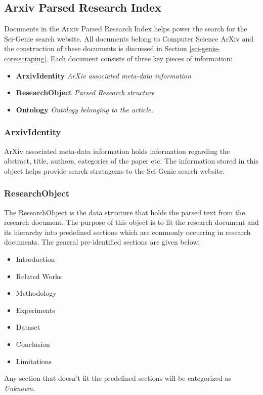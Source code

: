 \subsection{Arxiv Parsed Research Index}

Documents in the Arxiv Parsed Research Index helps power the search for the Sci-Genie search website. All documents belong to Computer Science ArXiv and 
the construction of these documents is discussed in Section \ref{sci-genie-core:scraping}. Each document consists of three 
key pieces of information:
\begin{itemize}
    \item \textbf{ArxivIdentity} \textit{ArXiv associated meta-data information}
    \item \textbf{ResearchObject} \textit{Parsed Research structure}
    \item \textbf{Ontology} \textit{Ontology belonging to the article.}
\end{itemize}

\subsubsection{ArxivIdentity}
ArXiv associated meta-data information holds information regarding the abstract, title, authors, categories of the paper etc. 
The information stored in this object helps provide search stratagems to the Sci-Genie search website. 

\subsubsection{ResearchObject}
\label{sci-genie-core:data-layer:researchobj}
The ResearchObject is the data structure that holds the parsed text from the research document. 
The purpose of this object is to fit the research document and its hierarchy into predefined sections
which are commonly occurring in research documents. The general pre-identified sections are given below:
\begin{itemize}
    \item Introduction
    \item Related Works
    \item Methodology
    \item Experiments
    \item Dataset
    \item Conclusion
    \item Limitations
\end{itemize} 
Any section that doesn't fit the predefined sections will be categorized as \textit{Unknown}. 

